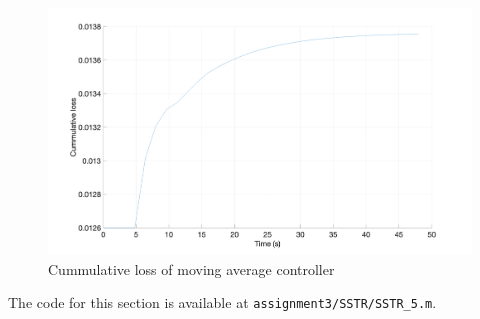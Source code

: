 \begin{figure}
	\centering
	\includegraphics[width=\textwidth]{images/sstr52.png}
	\caption{Cummulative loss of moving average controller}
	\label{fig:sstr52}
\end{figure}

\noindent The code for this section is available at \lstinline|assignment3/SSTR/SSTR_5.m|. 
